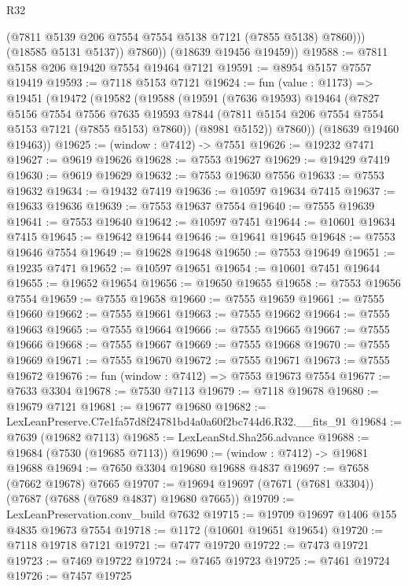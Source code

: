 \begin{lexlean}{R32}
\begin{coremodule}
                (@7811 @5139 @206 @7554 @7554 @5138 @7121 (@7855 @5138) @7860)))
            (@18585 @5131 @5137))
          @7860))
      (@18639 @19456 @19459))
@19588 := @7811 @5158 @206 @19420 @7554 @19464 @7121
@19591 := @8954 @5157 @7557 @19419
@19593 := @7118 @5153 @7121
@19624 := fun (value : @1173) =>
  @19451
    (@19472
      (@19582
        (@19588
          (@19591
            (@7636 @19593)
            @19464
            (@7827
              @5156
              @7554
              @7556
              @7635
              @19593
              @7844
              (@7811 @5154 @206 @7554 @7554 @5153 @7121 (@7855 @5153) @7860))
            (@8981 @5152))
          @7860))
      (@18639 @19460 @19463))
@19625 := (window : @7412) -> @7551
@19626 := @19232 @7471
@19627 := @9619 @19626
@19628 := @7553 @19627
@19629 := @19429 @7419
@19630 := @9619 @19629
@19632 := @7553 @19630 @7556
@19633 := @7553 @19632
@19634 := @19432 @7419
@19636 := @10597 @19634 @7415
@19637 := @19633 @19636
@19639 := @7553 @19637 @7554
@19640 := @7555 @19639
@19641 := @7553 @19640
@19642 := @10597 @7451
@19644 := @10601 @19634 @7415
@19645 := @19642 @19644
@19646 := @19641 @19645
@19648 := @7553 @19646 @7554
@19649 := @19628 @19648
@19650 := @7553 @19649
@19651 := @19235 @7471
@19652 := @10597 @19651
@19654 := @10601 @7451 @19644
@19655 := @19652 @19654
@19656 := @19650 @19655
@19658 := @7553 @19656 @7554
@19659 := @7555 @19658
@19660 := @7555 @19659
@19661 := @7555 @19660
@19662 := @7555 @19661
@19663 := @7555 @19662
@19664 := @7555 @19663
@19665 := @7555 @19664
@19666 := @7555 @19665
@19667 := @7555 @19666
@19668 := @7555 @19667
@19669 := @7555 @19668
@19670 := @7555 @19669
@19671 := @7555 @19670
@19672 := @7555 @19671
@19673 := @7555 @19672
@19676 := fun (window : @7412) => @7553 @19673 @7554
@19677 := @7633 @3304
@19678 := @7530 @7113
@19679 := @7118 @19678
@19680 := @19679 @7121
@19681 := @19677 @19680
@19682 := LexLeanPreserve.C7e1fa57d8f24781bd4a0a60f2bc744d6.R32.__fits_91
@19684 := @7639 (@19682 @7113)
@19685 := LexLeanStd.Sha256.advance
@19688 := @19684 (@7530 (@19685 @7113))
@19690 := (window : @7412) -> @19681 @19688
@19694 := @7650 @3304 @19680 @19688 @4837
@19697 := @7658 (@7662 @19678) @7665
@19707 := @19694 @19697 (@7671 (@7681 @3304)) (@7687 (@7688 (@7689 @4837) @19680 @7665))
@19709 := LexLeanPreservation.conv_build @7632
@19715 := @19709 @19697 @1406 @155 @4835 @19673 @7554
@19718 := @1172 (@10601 @19651 @19654)
@19720 := @7118 @19718 @7121
@19721 := @7477 @19720
@19722 := @7473 @19721
@19723 := @7469 @19722
@19724 := @7465 @19723
@19725 := @7461 @19724
@19726 := @7457 @19725

\end{coremodule}
\end{lexlean}
